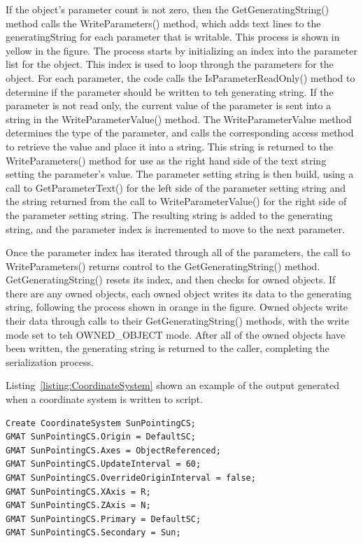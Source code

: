 If the object's parameter count is not zero, then the GetGeneratingString() method calls the
WriteParameters() method, which adds text lines to the generatingString for each parameter that is
writable.  This process is shown in yellow in the figure.  The process starts by initializing an
index into the parameter list for the object.  This index is used to loop through the parameters
for the object.  For each parameter, the code calls the IsParameterReadOnly() method to determine
 if the parameter should be written to teh generating string.  If the parameter is not read only,
the current value of the parameter is sent into a string in the WriteParameterValue() method.  The
WriteParameterValue method determines the type of the parameter, and calls the corresponding access
method to retrieve the value and place it into a string.  This string is returned to the
WriteParameters() method for use as the right hand side of the text string setting the parameter's
value.  The parameter setting string is then build, using a call to GetParameterText() for the left
side of the parameter setting string and the string returned from the call to WriteParameterValue()
for the right side of the parameter setting string.  The resulting string is added to the
generating string, and the parameter index is incremented to move to the next parameter.

Once the parameter index has iterated through all of the parameters, the call to WriteParameters()
returns control to the GetGeneratingString() method.  GetGeneratingString() resets its index, and
then checks for owned objects.  If there are any owned objects, each owned object writes its data
to the generating string, following the process shown in orange in the figure.  Owned objects write
their data through calls to their GetGeneratingString() methods, with the write mode set to teh
OWNED\_OBJECT mode.  After all of the owned objects have been written, the generating string is
returned to the caller, completing the serialization process.

Listing~\ref{listing:CoordinateSystem} shown an example of the output generated when a coordinate
system is written to script.

\begin{lstlisting}[caption={Script Listing for a Coordinate System},
label={listing:CoordinateSystem}]
Create CoordinateSystem SunPointingCS;
GMAT SunPointingCS.Origin = DefaultSC;
GMAT SunPointingCS.Axes = ObjectReferenced;
GMAT SunPointingCS.UpdateInterval = 60;
GMAT SunPointingCS.OverrideOriginInterval = false;
GMAT SunPointingCS.XAxis = R;
GMAT SunPointingCS.ZAxis = N;
GMAT SunPointingCS.Primary = DefaultSC;
GMAT SunPointingCS.Secondary = Sun;
\end{lstlisting}
\lstset{numbers=none}

